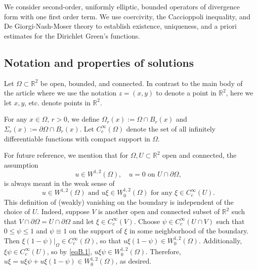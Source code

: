 \documentclass[12pt,reqno]{amsart}
\theoremstyle{plain}
\theoremstyle{definition}
\newcommand{\Om}{\Omega}
\newcommand{\Si}{\Sigma}
\newcommand{\iny}{\infty}
\newcommand{\del}{ \partial}
\newcommand{\su}{\subset}
\newcommand{\pr}[1]{\left( #1 \right) }
\newcommand{\R}{\ensuremath{\mathbb{R}}}
\begin{document}
\begin{appendix}
We consider second-order, uniformly elliptic, bounded operators of divergence form with one first order term.
We use coercivity, the Caccioppoli inequality, and De Giorgi-Nash-Moser theory to establish existence, uniqueness, and a priori estimates for the Dirichlet Green's functions.

\subsection*{Notation and properties of solutions}

Let $\Om \su \R^2$ be open, bounded, and connected. 
In contrast to the main body of the article where we use the notation $z = \pr{x, y}$ to denote a point in $\R^2$, here we let $x, y$, etc. denote points in $\R^2$.

For any $x \in \Om$, $r > 0$, we define $\Om_r(x):=\Om \cap B_r(x)$ and $\Si_r\pr{x} := \del \Om \cap B_r\pr{x}$.
Let $C^\iny_c\pr{\Om}$ denote the set of all infinitely differentiable functions with compact support in $\Om$. 

For future reference, we mention that for $\Omega, U\subset \R^2$ open and connected, the assumption 
\begin{equation*}
u \in W^{1,2}(\Omega), \quad u={ 0} \mbox{ on } U\cap \partial\Om, 
\end{equation*}
is always meant in the weak sense of 
\begin{equation}
\label{eqB.1}
u \in W^{1,2}(\Omega) \mbox{ and } u \xi \in W^{1,2}_0(\Omega) \mbox{ for any } \xi \in C_c^\infty(U).
\end{equation}
This definition of (weakly) vanishing on the boundary is independent of the choice of $U$.  
Indeed, suppose $V$ is another open and connected subset of $\R^2$ such that $V \cap \partial \Om = U \cap \partial \Om$ and let $\xi \in C_c^\infty\pr{V}$.
Choose $\psi \in C_c^\infty\pr{U \cap V}$ such that $0\le \psi \le 1$ and $\psi \equiv 1$ on the support of $\xi$ in some neighborhood of the boundary.
Then $\xi \pr{1-\psi}|_{\Om}\in C_c^\infty\pr{\Om}$, so that $u \xi \pr{1-\psi} \in W^{1,2}_0\pr{\Om}$.
Additionally, $\xi \psi \in C_c^\infty\pr{U}$, so by \eqref{eqB.1}, $u \xi \psi \in W^{1,2}_0 \pr{\Om}$.
Therefore, $u \xi = u \xi \psi + u \xi \pr{1-\psi} \in W^{1,2}_0\pr{\Om}$, as desired.


\end{appendix}
\end{document}
